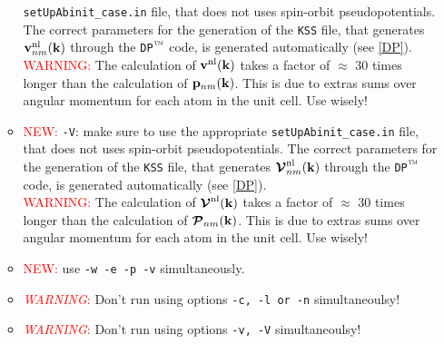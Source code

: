 \documentclass[12pt]{article}
\numberwithin{equation}{section}
\begin{document}
\begin{enumerate}
\begin{itemize}
  \verb=setUpAbinit_case.in= file, that does not uses spin-orbit 
  pseudopotentials.  The correct parameters for the generation 
  of the \verb=KSS= file, that generates $\mathbf{v}^{\mathrm{nl}}_{nm}(\mathbf{k})$ 
through 
  the \verb=DP=$\tm$ code, is generated automatically (see \ref{DP}).\\ 
\textcolor{red}{WARNING:} The calculation of $\mathbf{v}^{\mathrm{nl}}(\mathbf{k})$ takes a 
factor of $\approx$ 30 times longer than the calculation of 
$\mathbf{p}_{nm}(\mathbf{k})$. This is due to extras sums over angular momentum 
for each atom in the unit cell. Use wisely!
\item \textcolor{red}{NEW:}
\verb=-V=: make sure to use the appropriate 
  \verb=setUpAbinit_case.in= file, that does not uses spin-orbit 
  pseudopotentials.  The correct parameters for the generation 
  of the \verb=KSS= file, that generates $\boldsymbol{\mathcal{\cal V}}^{\mathrm{nl}}_{nm}(\mathbf{k})$ 
through 
  the \verb=DP=$\tm$ code, is generated automatically (see \ref{DP}).\\ 
\textcolor{red}{WARNING:} The calculation of $\boldsymbol{\mathcal{\cal V}}^{\mathrm{nl}}(\mathbf{k})$ takes a 
factor of $\approx$ 30 times longer than the calculation of 
$\boldsymbol{\mathcal{\cal P}}_{nm}(\mathbf{k})$. This is due to extras sums over angular momentum 
for each atom in the unit cell. Use wisely!
\item \textcolor{red}{NEW:}
use \verb=-w -e -p -v= simultaneously.
\item \textcolor{red}{{\it WARNING}:} Don't run using options 
\verb=-c, -l or -n= simultaneoulsy!
\item \textcolor{red}{{\it WARNING}:} Don't run using options 
\verb=-v, -V= simultaneoulsy!
\end{itemize}


\end{enumerate}
\end{document}
